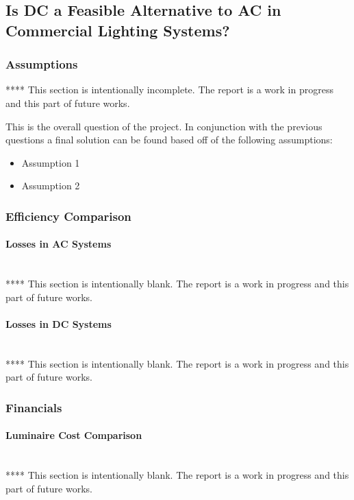 \subsection{Is DC a Feasible Alternative to AC in Commercial Lighting Systems?}

\subsubsection{Assumptions}
****
\newline
This section is intentionally incomplete. The report is a work in progress and this part of future works.  

This is the overall question of the project. In conjunction with the previous questions a final solution can be found based off of the following assumptions:

\begin{itemize}[noitemsep,nolistsep]
	\item Assumption 1
	\item Assumption 2
\end{itemize}

\subsubsection{Efficiency Comparison}

\paragraph{Losses in AC Systems}
~\\
****
\newline
This section is intentionally blank. The report is a work in progress and this part of future works.  

\paragraph{Losses in DC Systems}
~\\
****
\newline
This section is intentionally blank. The report is a work in progress and this part of future works.  

\subsubsection{Financials}

\paragraph{Luminaire Cost Comparison}
~\\
****
\newline
This section is intentionally blank. The report is a work in progress and this part of future works.  

